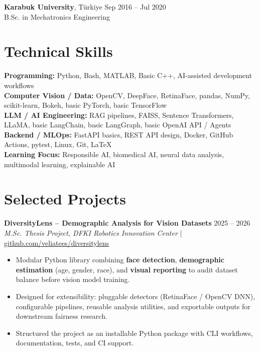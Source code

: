 \documentclass[a4paper,9.5pt]{extarticle}
\begin{document}
\textbf{Karabuk University}, Türkiye \hfill Sep 2016 -- Jul 2020\\
B.Sc. in Mechatronics Engineering\\

\section*{Technical Skills}
\textbf{Programming:} Python, Bash, MATLAB, Basic C++, AI-assisted development workflows\\
\textbf{Computer Vision / Data:} OpenCV, DeepFace, RetinaFace, pandas, NumPy, scikit-learn, Bokeh, basic PyTorch, basic TensorFlow\\
\textbf{LLM / AI Engineering:} RAG pipelines, FAISS, Sentence Transformers, LLaMA, basic LangChain, basic LangGraph, basic OpenAI API / Agents\\
\textbf{Backend / MLOps:} FastAPI basics, REST API design, Docker, GitHub Actions, pytest, Linux, Git, LaTeX\\
\textbf{Learning Focus:} Responsible AI, biomedical AI, neural data analysis, multimodal learning, explainable AI

\section*{Selected Projects}
\textbf{DiversityLens -- Demographic Analysis for Vision Datasets} \hfill 2025 -- 2026\\
\textit{M.Sc. Thesis Project, DFKI Robotics Innovation Center} \;|\; \href{https://github.com/veliatees/diversitylens}{github.com/veliatees/diversitylens}
\begin{itemize}[leftmargin=*, itemsep=0pt, topsep=1pt, parsep=0pt]
    \item Modular Python library combining \textbf{face detection}, \textbf{demographic estimation} (age, gender, race), and \textbf{visual reporting} to audit dataset balance before vision model training.
    \item Designed for extensibility: pluggable detectors (RetinaFace / OpenCV DNN), configurable pipelines, reusable analysis utilities, and exportable outputs for downstream fairness research.
    \item Structured the project as an installable Python package with CLI workflows, documentation, tests, and CI support.
\end{itemize}
\end{document}
